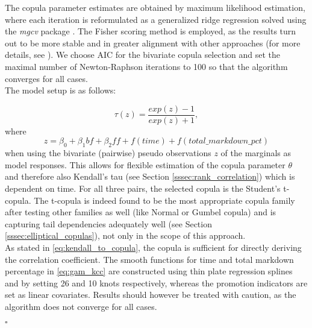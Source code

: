 The copula parameter estimates are obtained by maximum likelihood estimation, where each iteration is reformulated as a generalized ridge regression solved using the \textit{mgcv} package \citep{wood2017generalized}. The Fisher scoring method is employed, as the results turn out to be more stable and in greater alignment with other approaches (for more details, see \cite{vatter2018generalized}).  We choose \ac{AIC} for the bivariate copula selection and set the maximal number of Newton-Raphson iterations to 100 so that the algorithm converges for all cases.  \\
The model setup is as follows: 

\begin{equation}
\tau(z) = \frac{exp(z) - 1}{exp(z) + 1},
\label{eq:tau_link}
\end{equation}
where
\begin{equation}
z = \beta_0 + \beta_1 \textit{bf} + \beta_2 \textit{ff} + f(\textit{time}) + f(\textit{total\_markdown\_pct})
\label{eq:gam_kcc}
\end{equation}
when using the bivariate (pairwise) pseudo observations $z$ of the marginals as model responses. This allows for flexible estimation of the copula parameter $\theta$ and therefore also Kendall's tau (see Section \ref{sssec:rank_correlation}) which is dependent on time. For all three pairs, the selected copula is the Student's t-copula. The t-copula is indeed found to be the most appropriate copula family after testing other families as well (like Normal or Gumbel copula) and is capturing tail dependencies adequately well (see Section \ref{sssec:elliptical_copulas}), not only in the scope of this approach. \\
As stated in \autoref{eq:kendall_to_copula}, the copula is sufficient for directly deriving the correlation coefficient. The smooth functions for time and total markdown percentage in \autoref{eq:gam_kcc} are constructed using thin plate regression splines and by setting 26 and 10 knots respectively, whereas the promotion indicators are set as linear covariates. Results should however be treated with caution, as the algorithm does not converge for all cases. 


\hfill $\square$ \\


